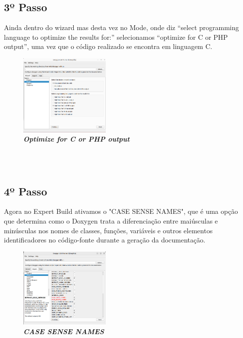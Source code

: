 \documentclass[a4wide]{report}
\begin{document}
{{{{\subsection{3º Passo}
\Large
Ainda dentro do wizard mas desta vez no Mode, onde diz “select programming language to optimize the results for:” selecionamos “optimize for C or PHP output”, uma vez que o código realizado se encontra em linguagem C.
\begin{figure}[hbt]
    \centering
    \includegraphics[width=0.40\textwidth]{imagem_3.png}
    \caption{\textbf{\textit{Optimize for C or PHP output}}\label{fig:imagem}}
\end{figure}
\\
\\


\subsection{4º Passo}
\Large
Agora no Expert Build ativamos o "CASE SENSE NAMES", que é uma opção que determina como o Doxygen trata a diferenciação entre maiúsculas e minúsculas nos nomes de classes, funções, variáveis e outros elementos identificadores no código-fonte durante a geração da documentação.
\begin{figure}[hbt]
    \centering
    \includegraphics[width=0.40\textwidth]{imagem_4.png}
    \caption{\textbf{\textit{CASE SENSE NAMES}}\label{fig:imagem}}
\end{figure}


\newpage
}}}}
\end{document}
